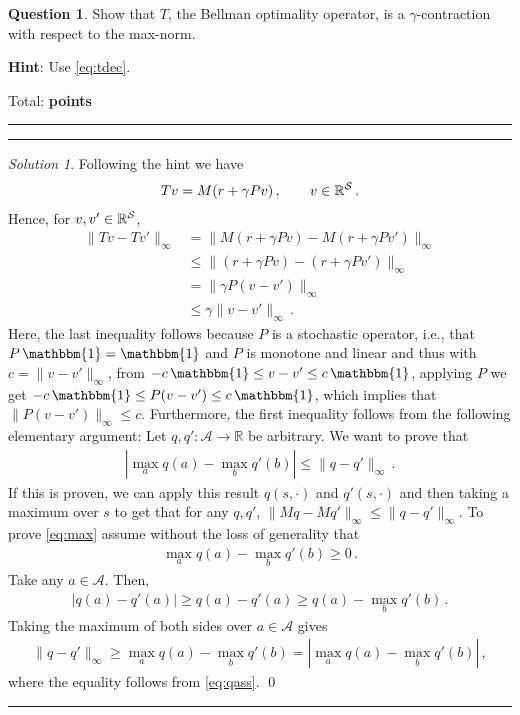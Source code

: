 \documentclass{article}
\newcommand{\norm}[1]{\| #1 \|}
\newcommand{\R}{\mathbb{R}}
\DeclareMathOperator*{\1}{\mathbbm{1}}
\newcounter{DocPoints} %
\newcounter{QuestionPoints} %
\newcommand{\tpoints}[1]{        %
	\ifthenelse{\isempty{#1}}%
	{%
	}%
	{%
		\addtocounter{DocPoints}{#1}
		\addtocounter{QuestionPoints}{#1}
	}													 %
	\par\mbox{}\par\noindent\hfill {Total: \bf \arabic{QuestionPoints}\xspace points}\par\mbox{}\par\hrule\hrule
	\setcounter{QuestionPoints}{0}
}
\theoremstyle{definition}
\newtheorem{question}{Question}
\theoremstyle{remark}
\newtheorem*{solution*}{Solution}
\newcommand{\hint}{\noindent \textbf{Hint}:\xspace}
\newcommand{\cS}{\mathcal{S}}
\newcommand{\cA}{\mathcal{A}}
\begin{document}
\begin{question}
Show that $T$, the Bellman optimality operator, is a $\gamma$-contraction with respect to the max-norm.

\hint Use \eqref{eq:tdec}.
\tpoints{5}
\end{question}

\begin{solution*}
Following the hint we have
\begin{align*}
T v = M( r + \gamma P v)\,, \qquad v\in \RR^{\cS}\,.
\end{align*}
Hence, for $v,v'\in \RR^{\cS}$,
\begin{align*}
\norm{ T v  - T v' }_\infty
&= \norm{ M( r + \gamma P v) - M( r + \gamma P v') }_\infty \\
&\le \norm{ ( r + \gamma P v) - ( r + \gamma P v') }_\infty \\
&= \norm{ \gamma P (v - v' ) }_\infty \\
&\le \gamma \norm{ v - v' }_\infty \,.
\end{align*}
Here, the last inequality follows because $P$ is a stochastic operator, i.e., that $P \1 = \1$ and $P$ is monotone and linear and thus with $c= \norm{v-v'}_\infty$,
 from $-c \1 \le v-v' \le c \1$, applying $P$ we get $-c \1 \le P(v-v') \le c \1$, which implies that $\norm{P(v-v')}_\infty \le c$.
Furthermore, the first inequality follows from the following elementary argument:
Let $q,q':\cA \to \R$ be arbitrary. We want to prove that 
\begin{align}
|\max_a q(a) - \max_b q'(b) | \le \norm{q-q'}_\infty\,.
\label{eq:max}
\end{align}
If this is proven, we can apply this result
$q(s,\cdot)$ and $q'(s,\cdot)$ and then taking a maximum over $s$ to get that for any $q,q'$, $\norm{Mq - M q'}_\infty \le \norm{q-q'}_\infty$.
To prove \eqref{eq:max} assume without the loss of generality that 
\begin{align}
\max_a q(a) - \max_b q'(b) \ge 0\,.
\label{eq:qass}
\end{align}
Take any $a\in \cA$. Then,
\begin{align*}
|q(a)-q'(a)| \ge q(a) - q'(a) \ge q(a) - \max_b q'(b)\,.
\end{align*}
Taking the maximum of both sides over $a\in \cA$ gives
\begin{align*}
\norm{q-q'}_\infty \ge \max_a q(a) - \max_b q'(b) = |\max_a q(a) - \max_b q'(b)|\,,
\end{align*}
where the equality follows from \eqref{eq:qass}.
\qed\par\smallskip\hrule
\end{solution*}
\fi
\end{document}
